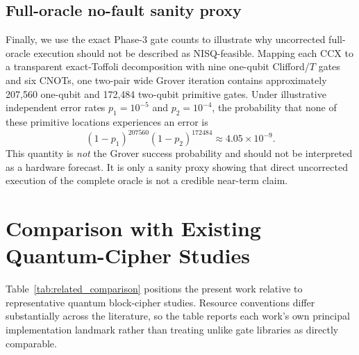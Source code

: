 \documentclass[pdflatex,sn-nature]{sn-jnl}
\theoremstyle{thmstyleone}
\theoremstyle{thmstyletwo}
\begin{document}
\subsection{Full-oracle no-fault sanity proxy}
Finally, we use the exact Phase-3 gate counts to illustrate why uncorrected full-oracle execution should not be described as NISQ-feasible. Mapping each CCX to a transparent exact-Toffoli decomposition with nine one-qubit Clifford/$T$ gates and six CNOTs, one two-pair wide Grover iteration contains approximately 207,560 one-qubit and 172,484 two-qubit primitive gates. Under illustrative independent error rates $p_1=10^{-5}$ and $p_2=10^{-4}$, the probability that none of these primitive locations experiences an error is
\begin{equation}
    (1-p_1)^{207560}(1-p_2)^{172484}\approx4.05\times10^{-9}.
\end{equation}
This quantity is \emph{not} the Grover success probability and should not be interpreted as a hardware forecast. It is only a sanity proxy showing that direct uncorrected execution of the complete oracle is not a credible near-term claim.

\section{Comparison with Existing Quantum-Cipher Studies}

Table~\ref{tab:related_comparison} positions the present work relative to representative quantum block-cipher studies. Resource conventions differ substantially across the literature, so the table reports each work's own principal implementation landmark rather than treating unlike gate libraries as directly comparable.
\end{document}
